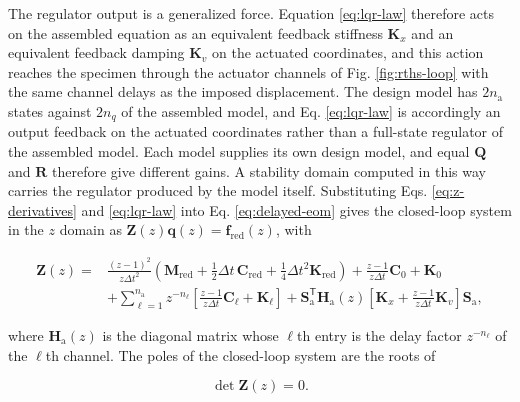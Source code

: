 \documentclass[a4paper,fleqn,review,12pt]{cas-sc}
\numberwithin{equation}{section}
\begin{document}
The regulator output is a generalized force. Equation \eqref{eq:lqr-law} therefore acts on the assembled equation as an equivalent feedback stiffness \(\mathbf{K}_{x}\) and an equivalent feedback damping \(\mathbf{K}_{v}\) on the actuated coordinates, and this action reaches the specimen through the actuator channels of Fig. \ref{fig:rths-loop} with the same channel delays as the imposed displacement. The design model has \(2n_{\mathrm{a}}\) states against \(2n_{q}\) of the assembled model, and Eq. \eqref{eq:lqr-law} is accordingly an output feedback on the actuated coordinates rather than a full-state regulator of the assembled model. Each model supplies its own design model, and equal \(\mathbf{Q}\) and \(\mathbf{R}\) therefore give different gains. A stability domain computed in this way carries the regulator produced by the model itself.
Substituting Eqs. \eqref{eq:z-derivatives} and \eqref{eq:lqr-law} into Eq. \eqref{eq:delayed-eom} gives the closed-loop system in the \(z\) domain as \(\mathbf{Z}(z)\bm{q}(z)=\bm{f}_{\mathrm{red}}(z)\), with

\vspace{-3.5em}
\begin{equation}
	\begin{aligned}
		\mathbf{Z}(z)={}&
		\frac{(z-1)^{2}}{z\Delta t^{2}}
		\left(\mathbf{M}_{\mathrm{red}}
		+\tfrac{1}{2}\Delta t\,\mathbf{C}_{\mathrm{red}}
		+\tfrac{1}{4}\Delta t^{2}\mathbf{K}_{\mathrm{red}}\right)
		+\frac{z-1}{z\Delta t}\mathbf{C}_{0}+\mathbf{K}_{0}\\
		&+\sum_{\ell=1}^{n_{\mathrm{a}}}z^{-n_{\ell}}
		\left[
		\frac{z-1}{z\Delta t}\mathbf{C}_{\ell}+\mathbf{K}_{\ell}
		\right]
		+\mathbf{S}_{\mathrm{a}}^{\mathsf{T}}\mathbf{H}_{\mathrm{a}}(z)
		\left[
		\mathbf{K}_{x}+\frac{z-1}{z\Delta t}\mathbf{K}_{v}
		\right]\mathbf{S}_{\mathrm{a}},
	\end{aligned}
	\label{eq:z-matrix}
\end{equation}
\vspace{-3.5em}

\noindent where \(\mathbf{H}_{\mathrm{a}}(z)\) is the diagonal matrix whose \(\ell\)th entry is the delay factor \(z^{-n_{\ell}}\) of the \(\ell\)th channel. The poles of the closed-loop system are the roots of

\vspace{-3.5em}
\begin{equation}
	\det\mathbf{Z}(z)=0.
	\label{eq:characteristic-equation}
\end{equation}
\vspace{-3.5em}
\end{document}
